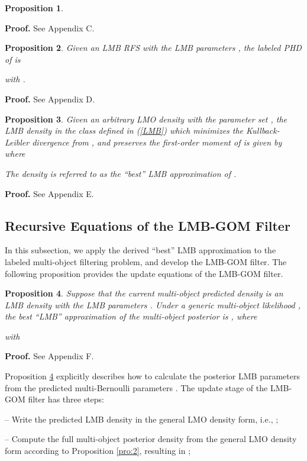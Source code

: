 \documentclass[journal]{IEEEtran}
\newtheorem{Pro}{Proposition}
\newcommand{\proproof}[1]{\noindent\textbf{Proof. } See Appendix #1.}
\begin{document}
{\begin{Pro}
\end{Pro}
\proproof{C}





\begin{Pro}\label{pro:4}
Given an LMB RFS  with the LMB parameters , the labeled PHD of  is

with 
.
\end{Pro}

\proproof{D}




\begin{Pro}\label{pro:5}
Given an arbitrary LMO density with the parameter set ,
the LMB  density in the class defined in (\ref{LMB}) which minimizes the Kullback-Leibler divergence from , and  preserves the first-order moment of  is given by  where 

The density  is referred to as the ``best'' LMB approximation of .
\end{Pro}

\proproof{E}
\subsection{Recursive Equations of the LMB-GOM Filter}
In this subsection, we apply  the derived ``best'' LMB approximation  to the labeled multi-object filtering problem, and develop the LMB-GOM filter.  The following proposition provides the update equations of the LMB-GOM filter.
\begin{Pro}\label{pro:6}
 Suppose that the current multi-object predicted density is an LMB density with the LMB parameters . Under a generic multi-object likelihood , the best ``LMB'' approximation of the multi-object posterior is , where


with

\end{Pro}




\proproof{F}





Proposition \ref{pro:6} explicitly describes how to calculate the posterior 
LMB parameters    from the predicted multi-Bernoulli parameters . The update stage of the LMB-GOM filter  has three steps:

\noindent-- Write the predicted LMB density in the general LMO density form, i.e., ;

\noindent-- Compute the full multi-object posterior density  from the general LMO density form according to Proposition \ref{pro:2}, resulting in ; 


}
\end{document}
